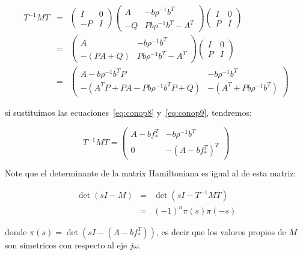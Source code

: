         \begin{eqnarray*}
            T^{-1} M T & = &
            \begin{pmatrix}
                I & 0 \\
                -P & I
            \end{pmatrix}
            \begin{pmatrix}
                A & -b \rho^{-1} b^T \\
                -Q & P b \rho^{-1} b^T - A^T
            \end{pmatrix}
            \begin{pmatrix}
                I & 0 \\
                P & I
            \end{pmatrix} \\
            & = &
            \begin{pmatrix}
                A & -b \rho^{-1} b^T \\
                -(PA + Q) & P b \rho^{-1} b^T - A^T
            \end{pmatrix}
            \begin{pmatrix}
                I & 0 \\
                P & I
            \end{pmatrix} \\
            & = &
            \begin{pmatrix}
                A - b \rho^{-1} b^T P & -b \rho^{-1} b^T \\
                -(A^TP + PA - Pb \rho^{-1} b^T P + Q) & - (A^T + P b \rho^{-1} b^T)
            \end{pmatrix}
        \end{eqnarray*}

        si sustituimos las ecuaciones~\ref{eq:conop8} y~\ref{eq:conop9}, tendremos:

        \begin{equation*}
            T^{-1} M T =
            \begin{pmatrix}
                A - b f_*^T & - b \rho^{-1} b^T \\
                0 & -(A - b f_*^T)^T
            \end{pmatrix}
        \end{equation*}

        \begin{nota}
            Note que el determinante de la matrix Hamiltoniana es igual al de esta matriz:

            \begin{eqnarray*}
                \det{(sI - M)} & = & \det{(sI - T^{-1}MT)} \\
                 & = & (-1)^n \pi(s) \pi(-s)
            \end{eqnarray*}

            donde $\pi(s) = \det{(sI - (A - b f_*^T))}$, es decir que los valores propios de $M$ son simetricos con respecto al eje $j\omega$.
        \end{nota}

